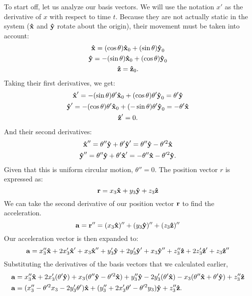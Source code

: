 To start off, let us analyze our basis vectors.
We will use the notation $x'$ as the derivative of $x$ with respect to time $t$.
Because they are not actually static in the system ($\uvec{x}$ and $\uvec{y}$ rotate about the origin), their movement must be taken into account:
\begin{gather*}
	\uvec{x} = (\cos\theta)\uvec{x}_0 + (\sin\theta)\uvec{y}_0 \\
	\uvec{y} = -(\sin\theta)\uvec{x}_0 + (\cos\theta)\uvec{y}_0 \\
	\uvec{z} = \uvec{z}_0 \text{.}
\end{gather*}
Taking their first derivatives, we get:
\begin{gather*}
	\uvec{x}' = -(\sin\theta)\theta'\uvec{x}_0 + (\cos\theta)\theta'\uvec{y}_0 = \theta'\uvec{y} \\
	\uvec{y}' = -(\cos\theta)\theta'\uvec{x}_0 + (-\sin\theta)\theta'\uvec{y}_0 = -\theta'\uvec{x} \\
	\uvec{z}' = 0 \text{.}
\end{gather*}
And their second derivatives:
\begin{gather*}
	\uvec{x}'' = \theta''\uvec{y} + \theta'\uvec{y}' = \theta''\uvec{y} - \theta'^2\uvec{x} \\
	\uvec{y}'' = \theta''\uvec{y} + \theta'\uvec{x}' = -\theta''\uvec{x} - \theta'^2\uvec{y} \text{.}
\end{gather*}
Given that this is uniform circular motion, $\theta'' = 0$.
The position vector $r$ is expressed as:
\begin{equation*}
	\bvec{r} = x_3\uvec{x} + y_3\uvec{y} + z_3\uvec{z}
\end{equation*}
We can take the second derivative of our position vector $\bm{\mathbf{r}}$ to find the acceleration.
\begin{equation*}
	\bvec{a} = \bvec{r}'' = (x_3\uvec{x})'' + (y_3\uvec{y})'' + (z_3\uvec{z})''
\end{equation*}
Our acceleration vector is then expanded to:
\begin{equation*}
	\bvec{a} = x_3''\uvec{x} + 2x_3'\uvec{x}' + x_3\uvec{x}'' + y_3'\uvec{y} + 2y_3'\uvec{y}' + x_3\uvec{y}'' + z_3''\uvec{z} + 2z_3'\uvec{z}' + z_3\uvec{z}''
\end{equation*}
Substituting the derivatives of the basis vectors that we calculated earlier,
\begin{align}
	\bvec{a} &= x_3''\uvec{x} + 2x_3'(\theta'\uvec{y}) + x_3(\theta''\uvec{y} - \theta'^2\uvec{x}) + y_3''\uvec{y} - 2y_3'(\theta'\uvec{x}) - x_3(\theta''\uvec{x} + \theta'\uvec{y}) + z_3''\uvec{z} \nonumber \\
	\bvec{a} &= (x_3'' - \theta'^2x_3 - 2y_3'\theta')\uvec{x} + (y_3'' + 2x_3'\theta' - \theta'^2y_3)\uvec{y} + z_3''\uvec{z} \label{eqn:accel-rotate} \text{.}
\end{align}
